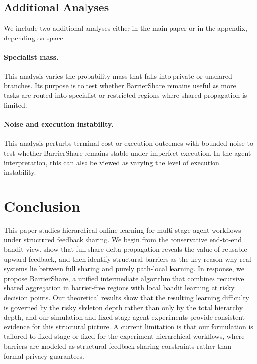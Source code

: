 \documentclass{article}
\begin{document}
\subsection{Additional Analyses}

We include two additional analyses either in the main paper or in the appendix, depending on space.

\paragraph{Specialist mass.}
This analysis varies the probability mass that falls into private or unshared branches. Its purpose is to test whether BarrierShare remains useful as more tasks are routed into specialist or restricted regions where shared propagation is limited.

\paragraph{Noise and execution instability.}
This analysis perturbs terminal cost or execution outcomes with bounded noise to test whether BarrierShare remains stable under imperfect execution. In the agent interpretation, this can also be viewed as varying the level of execution instability.
\section{Conclusion}

This paper studies hierarchical online learning for multi-stage agent workflows under structured feedback sharing. We begin from the conservative end-to-end bandit view, show that full-share delta propagation reveals the value of reusable upward feedback, and then identify structural barriers as the key reason why real systems lie between full sharing and purely path-local learning. In response, we propose BarrierShare, a unified intermediate algorithm that combines recursive shared aggregation in barrier-free regions with local bandit learning at risky decision points. Our theoretical results show that the resulting learning difficulty is governed by the risky skeleton depth rather than only by the total hierarchy depth, and our simulation and fixed-stage agent experiments provide consistent evidence for this structural picture. A current limitation is that our formulation is tailored to fixed-stage or fixed-for-the-experiment hierarchical workflows, where barriers are modeled as structural feedback-sharing constraints rather than formal privacy guarantees.
\end{document}

